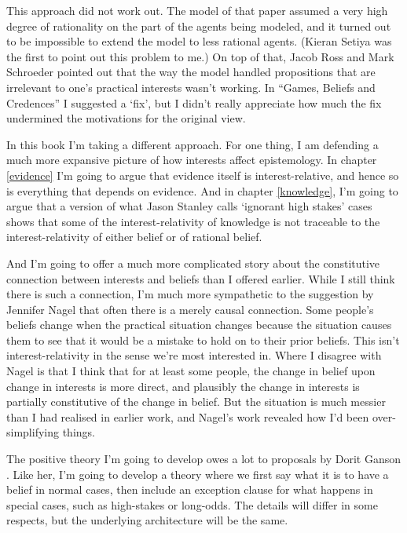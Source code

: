 \documentclass[
  11pt,
]{book}
\begin{document}
This approach did not work out. The model of that paper assumed a very high degree of rationality on the part of the agents being modeled, and it turned out to be impossible to extend the model to less rational agents. (Kieran Setiya was the first to point out this problem to me.) On top of that, Jacob Ross and Mark Schroeder \citeyearpar{RossSchroeder2014} pointed out that the way the model handled propositions that are irrelevant to one's practical interests wasn't working. In ``Games, Beliefs and Credences'' I suggested a `fix', but I didn't really appreciate how much the fix undermined the motivations for the original view.

In this book I'm taking a different approach. For one thing, I am defending a much more expansive picture of how interests affect epistemology. In chapter \ref{evidence} I'm going to argue that evidence itself is interest-relative, and hence so is everything that depends on evidence. And in chapter \ref{knowledge}, I'm going to argue that a version of what Jason Stanley \citeyearpar{Stanley2005} calls `ignorant high stakes' cases shows that some of the interest-relativity of knowledge is not traceable to the interest-relativity of either belief or of rational belief.

And I'm going to offer a much more complicated story about the constitutive connection between interests and beliefs than I offered earlier. While I still think there is such a connection, I'm much more sympathetic to the suggestion by Jennifer Nagel \citetext{\citeyear{Nagel2008}; \citeyear{Nagel2010}} that often there is a merely causal connection. Some people's beliefs change when the practical situation changes because the situation causes them to see that it would be a mistake to hold on to their prior beliefs. This isn't interest-relativity in the sense we're most interested in. Where I disagree with Nagel is that I think that for at least some people, the change in belief upon change in interests is more direct, and plausibly the change in interests is partially constitutive of the change in belief. But the situation is much messier than I had realised in earlier work, and Nagel's work revealed how I'd been over-simplifying things.

The positive theory I'm going to develop owes a lot to proposals by Dorit Ganson \citetext{\citeyear{Ganson2008}; \citeyear{Ganson2019}}. Like her, I'm going to develop a theory where we first say what it is to have a belief in normal cases, then include an exception clause for what happens in special cases, such as high-stakes or long-odds. The details will differ in some respects, but the underlying architecture will be the same.
\end{document}
